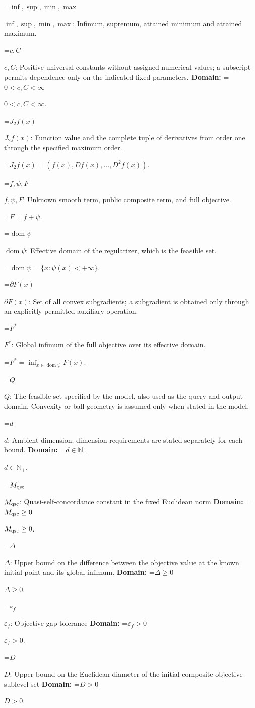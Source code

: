 \documentclass[10pt,a4paper]{article}
\newcommand{\AtlasMath}[1]{\par\begingroup\centering\setbox0=\hbox{$\displaystyle #1$}\ifdim\wd0>1.4\linewidth\typeout{ATLAS WIDE FORMULA: \the\wd0}\fi\ifdim\wd0>\linewidth\resizebox{\linewidth}{!}{\box0}\else\box0\fi\par\endgroup}
\newcommand{\AtlasInlineMath}[1]{\begingroup\setbox0=\hbox{$#1$}\ifdim\wd0>.4\linewidth\endgroup\AtlasMath{#1}\else\endgroup$#1$\fi}
\begin{document}
\AtlasInlineMath{\inf,\sup,\min,\max}: Infimum, supremum, attained minimum and attained maximum.

\AtlasInlineMath{c,C}: Positive universal constants without assigned numerical values; a subscript permits dependence only on the indicated fixed parameters. \textbf{Domain:} \AtlasInlineMath{0<c,C<\infty}.

\AtlasInlineMath{J_{2}f(x)}: Function value and the complete tuple of derivatives from order one through the specified maximum order.


\AtlasMath{J_{2}f(x)=(f(x),Df(x),\ldots,D^{2}f(x)).}


\AtlasInlineMath{f,\psi,F}: Unknown smooth term, public composite term, and full objective.


\AtlasMath{F=f+\psi.}


\AtlasInlineMath{\operatorname{dom}\psi}: Effective domain of the regularizer, which is the feasible set.


\AtlasMath{\operatorname{dom}\psi=\{x:\psi(x)<+\infty\}.}


\AtlasInlineMath{\partial F(x)}: Set of all convex subgradients; a subgradient is obtained only through an explicitly permitted auxiliary operation.

\AtlasInlineMath{F^*}: Global infimum of the full objective over its effective domain.


\AtlasMath{F^*=\inf_{x\in\operatorname{dom}\psi}F(x).}


\AtlasInlineMath{Q}: The feasible set specified by the model, also used as the query and output domain. Convexity or ball geometry is assumed only when stated in the model.

\AtlasInlineMath{d}: Ambient dimension; dimension requirements are stated separately for each bound. \textbf{Domain:} \AtlasInlineMath{d\in\mathbb{N}_{+}}.

\AtlasInlineMath{M_{\rm qsc}}: Quasi-self-concordance constant in the fixed Euclidean norm \textbf{Domain:} \AtlasInlineMath{M_{\rm qsc}\ge0}.

\AtlasInlineMath{\Delta}: Upper bound on the difference between the objective value at the known initial point and its global infimum. \textbf{Domain:} \AtlasInlineMath{\Delta\ge0}.

\AtlasInlineMath{\varepsilon_f}: Objective-gap tolerance \textbf{Domain:} \AtlasInlineMath{\varepsilon_f>0}.

\AtlasInlineMath{D}: Upper bound on the Euclidean diameter of the initial composite-objective sublevel set \textbf{Domain:} \AtlasInlineMath{D>0}.
\end{document}
